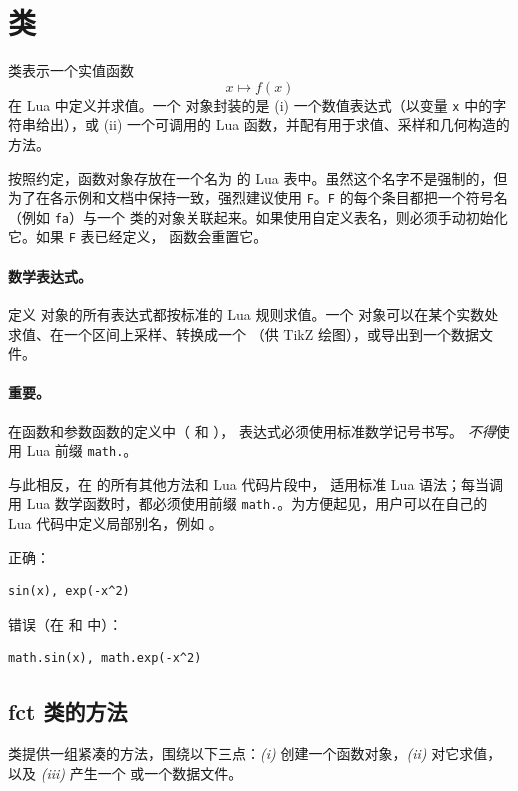 \newpage
\section{ 类}
\label{sec:class_fct}

 类表示一个实值函数
\[
x \longmapsto f(x)
\]
在 Lua 中定义并求值。一个  对象封装的是 (i) 一个数值表达式（以变量 \texttt{x} 中的字符串给出），或 (ii) 一个可调用的 Lua 函数，并配有用于求值、采样和几何构造的方法。

按照约定，函数对象存放在一个名为  的 Lua 表中。虽然这个名字不是强制的，但为了在各示例和文档中保持一致，强烈建议使用 \texttt{F}。\texttt{F} 的每个条目都把一个符号名（例如 \texttt{fa}）与一个  类的对象关联起来。如果使用自定义表名，则必须手动初始化它。如果 \texttt{F} 表已经定义， 函数会重置它。

\paragraph{数学表达式。}
定义  对象的所有表达式都按标准的 Lua 规则求值。一个  对象可以在某个实数处求值、在一个区间上采样、转换成一个 （供 TikZ 绘图），或导出到一个数据文件。

\paragraph{重要。}
在函数和参数函数的定义中（ 和 ），
表达式必须使用标准数学记号书写。
\emph{不得}使用 Lua 前缀 \texttt{math.}。

与此相反，在  的所有其他方法和 Lua 代码片段中，
适用标准 Lua 语法；每当调用 Lua 数学函数时，都必须使用前缀 \texttt{math.}。为方便起见，用户可以在自己的 Lua 代码中定义局部别名，例如 。


\medskip
正确：
\begin{verbatim}
sin(x), exp(-x^2)
\end{verbatim}

错误（在  和  中）：
\begin{verbatim}
math.sin(x), math.exp(-x^2)
\end{verbatim}

\subsection{fct 类的方法}
 类提供一组紧凑的方法，围绕以下三点：\emph{(i)} 创建一个函数对象，\emph{(ii)} 对它求值，以及 \emph{(iii)} 产生一个  或一个数据文件。

